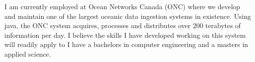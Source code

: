 I am currently employed at Ocean Networks Canada (ONC) where we develop and maintain one of the largest oceanic data ingestion systems in existence.
Using java, the ONC system acquires, processes and distributes over 200 terabytes of information per day.
I believe the skills I have developed working on this system will readily apply to 
I have a bachelors in computer engineering and a masters in applied science. 

